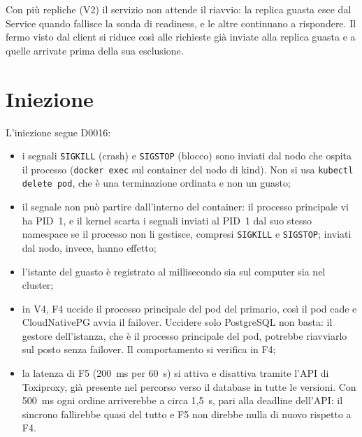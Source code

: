 Con più repliche (V2) il servizio non attende il riavvio: la replica guasta esce dal Service quando fallisce la sonda di readiness, e le altre continuano a rispondere. Il fermo visto dal client si riduce così alle richieste già inviate alla replica guasta e a quelle arrivate prima della sua esclusione.

\section{Iniezione}

L'iniezione segue D0016:

\begin{itemize}
  \item i segnali \texttt{SIGKILL} (crash) e \texttt{SIGSTOP} (blocco) sono inviati dal nodo che ospita il processo (\texttt{docker exec} sul container del nodo di kind). Non si usa \texttt{kubectl delete pod}, che è una terminazione ordinata e non un guasto;
  \item il segnale non può partire dall'interno del container: il processo principale vi ha PID~1, e il kernel scarta i segnali inviati al PID~1 dal suo stesso namespace se il processo non li gestisce, compresi \texttt{SIGKILL} e \texttt{SIGSTOP}; inviati dal nodo, invece, hanno effetto;
  \item l'istante del guasto è registrato al millisecondo sia sul computer sia nel cluster;
  \item in V4, F4 uccide il processo principale del pod del primario, così il pod cade e CloudNativePG avvia il failover. Uccidere solo PostgreSQL non basta: il gestore dell'istanza, che è il processo principale del pod, potrebbe riavviarlo sul posto senza failover. Il comportamento si verifica in F4;
  \item la latenza di F5 (200~ms per 60~s) si attiva e disattiva tramite l'API di Toxiproxy, già presente nel percorso verso il database in tutte le versioni. Con 500~ms ogni ordine arriverebbe a circa 1,5~s, pari alla deadline dell'API: il sincrono fallirebbe quasi del tutto e F5 non direbbe nulla di nuovo rispetto a F4.
\end{itemize}
